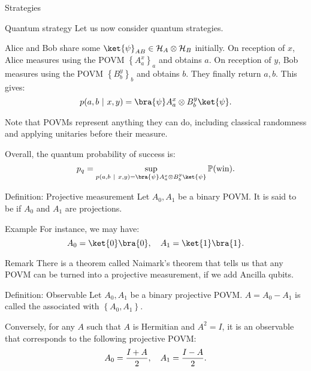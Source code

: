 \documentclass[a4paper]{article}
\begin{document}
\begin{parag}{Strategies}
    \begin{subparag}{Quantum strategy}
        Let us now consider quantum strategies.

        Alice and Bob share some $\ket{\psi}_{AB} \in \mathcal{H}_A \otimes \mathcal{H}_B$ initially. On reception of $x$, Alice measures using the POVM $\left\{A_a^x\right\}_a$ and obtains $a$. On reception of $y$, Bob measures using the POVM $\left\{B_b^y\right\}_b$ and obtains $b$. They finally return $a, b$. This gives: 
        \[p\left(a, b\suchthat x, y\right) = \bra{\psi} A_a^x \otimes B_b^y \ket{\psi}.\]

        Note that POVMs represent anything they can do, including classical randomness and applying unitaries before their measure.

        Overall, the quantum probability of success is: 
        \[p_q = \sup_{p\left(a, b \suchthat x, y\right) = \bra{\psi} A_a^x \otimes B_b^y \ket{\psi}} \prob\left(\text{win}\right).\]
    \end{subparag}
\end{parag}

\begin{parag}{Definition: Projective measurement}
    Let $A_0, A_1$ be a binary POVM. It is said to be  if $A_0$ and $A_1$ are projections. 

    \begin{subparag}{Example}
        For instance, we may have: 
        \[A_0 = \ket{0}\bra{0}, \mathspace A_1 = \ket{1}\bra{1}.\]
    \end{subparag}

    \begin{subparag}{Remark}
        There is a theorem called Naimark's theorem that tells us that any POVM can be turned into a projective measurement, if we add Ancilla qubits. 
    \end{subparag}
\end{parag}

\begin{parag}{Definition: Observable}
    Let $A_0, A_1$ be a binary projective POVM. $A = A_0 - A_1$ is called the  associated with $\left\{A_0, A_1\right\}$.

    Conversely, for any $A$ such that $A$ is Hermitian and $A^2 = I$, it is an observable that corresponds to the following projective POVM: 
    \[A_0 = \frac{I + A}{2}, \quad A_1 = \frac{I - A}{2}.\]
\end{parag}
\end{document}
